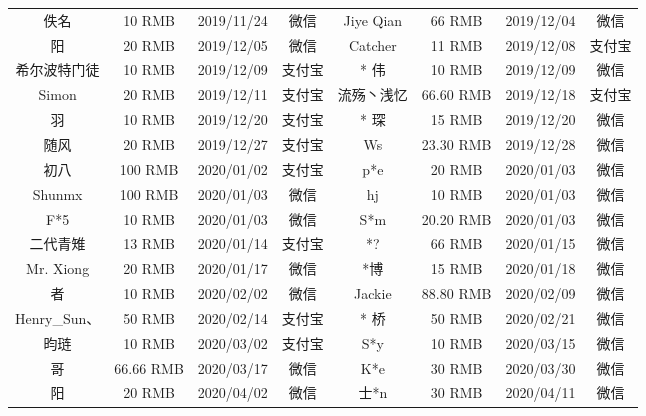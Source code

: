 \documentclass[cn,hazy,blue,14pt,screen]{elegantnote}
\begin{document}
\begin{table}[htbp]
\begin{tabular}{*{8}{>{\scriptsize}c}}
        佚名            & 10 RMB        & 2019/11/24    & 微信          & Jiye Qian       & 66 RMB        & 2019/12/04    & 微信          \\
        * 阳            & 20 RMB        & 2019/12/05    & 微信          & Catcher         & 11 RMB        & 2019/12/08    & 支付宝        \\
        希尔波特门徒    & 10 RMB        & 2019/12/09    & 支付宝        & * 伟            & 10 RMB        & 2019/12/09    & 微信          \\
        Simon           & 20 RMB        & 2019/12/11    & 支付宝        & 流殇丶浅忆      & 66.60 RMB     & 2019/12/18    & 支付宝        \\
        羽              & 10 RMB        & 2019/12/20    & 支付宝        & * 琛            & 15 RMB        & 2019/12/20    & 微信          \\
        随风            & 20 RMB        & 2019/12/27    & 支付宝        & Ws              & 23.30 RMB     & 2019/12/28    & 微信          \\
        初八            & 100 RMB       & 2020/01/02    & 支付宝        & p*e             & 20 RMB        & 2020/01/03    & 微信          \\
        Shunmx          & 100 RMB       & 2020/01/03    & 微信          & hj              & 10 RMB        & 2020/01/03    & 微信          \\
        F*5             & 10 RMB        & 2020/01/03    & 微信          & S*m             & 20.20 RMB     & 2020/01/03    & 微信          \\
        二代青雉        & 13 RMB        & 2020/01/14    & 支付宝        & *?              & 66 RMB        & 2020/01/15    & 微信          \\
        Mr. Xiong       & 20 RMB        & 2020/01/17    & 微信          & *博             & 15 RMB        & 2020/01/18    & 微信          \\
        * 者            & 10 RMB        & 2020/02/02    & 微信          & Jackie          & 88.80 RMB     & 2020/02/09    & 微信          \\
        Henry\_Sun、    & 50 RMB        & 2020/02/14    & 支付宝        & * 桥            & 50 RMB        & 2020/02/21    & 微信          \\
        昀琏            & 10 RMB        & 2020/03/02    & 支付宝        & S*y             & 10 RMB        & 2020/03/15    & 微信          \\
        * 哥            & 66.66 RMB     & 2020/03/17    & 微信          & K*e             & 30 RMB        & 2020/03/30    & 微信          \\
        * 阳            & 20 RMB        & 2020/04/02    & 微信          & 士*n            & 30 RMB        & 2020/04/11    & 微信          \\
        \bottomrule
    \end{tabular}%
    \label{tab:donation}%
\end{table}%
\end{document}
